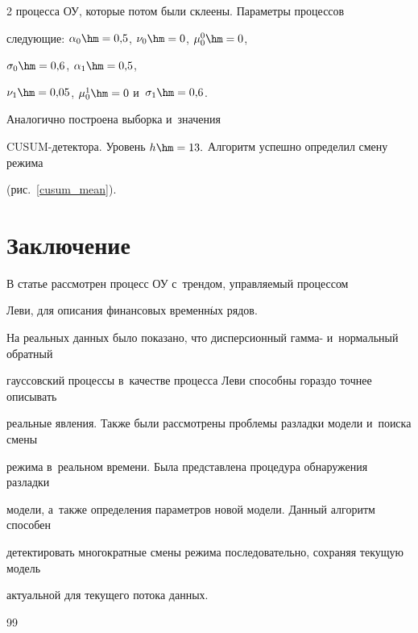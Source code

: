 \begin{multicols}{2}
процесса ОУ, которые потом были склеены. Параметры процессов 


следующие: $\alpha_0\hm=0{,}5$, $\nu_0\hm=0$, $\mu_0^0\hm=0$, 


$\sigma_0\hm=0{,}6$, $\alpha_1\hm=0{,}5$, 


$\nu_1\hm=0{,}05$, $\mu_0^1\hm=0$ и~$\sigma_1\hm=0{,}6$. 


Аналогично построена выборка и~значения 


CUSUM-де\-тек\-то\-ра. Уровень $h\hm=13.$ Алгоритм успешно определил смену режима 


(рис.~\ref{cusum_mean}).


       











\section {Заключение}





В статье рассмотрен процесс ОУ с~трендом, управ\-ля\-емый процессом 


Леви, для описания финансовых временн$\acute{\mbox{ы}}$х рядов.


На реальных данных было показано, что дисперсионный гамма- и~нормальный обратный 


гауссовский процессы в~качестве процесса Леви способны гораздо точнее описывать 


реальные явления. Также были рас\-смот\-ре\-ны проб\-ле\-мы разладки модели и~поиска смены 


режима в~реальном времени. Была представлена процедура обнаружения разладки 


модели, а~также определения параметров новой модели. Данный алгоритм способен 


детектировать многократные смены режима последовательно, сохраняя текущую модель 


актуальной для текущего потока данных.





{\small\frenchspacing


 {%




 \begin{thebibliography}{99}



\end{thebibliography}}}
\end{multicols}
